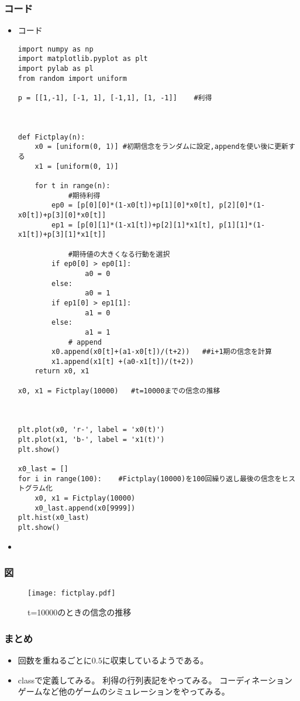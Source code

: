 \documentclass[dvipdfmx,fleqn]{beamer}
\begin{document}
\begin{frame}[fragile]%
\frametitle{コード}
\begin{itemize}\setlength{\parskip}{0.5em}
\item
コード
\begin{verbatim}
import numpy as np
import matplotlib.pyplot as plt
import pylab as pl
from random import uniform

p = [[1,-1], [-1, 1], [-1,1], [1, -1]]    #利得


        
def Fictplay(n):
    x0 = [uniform(0, 1)] #初期信念をランダムに設定,appendを使い後に更新する
    x1 = [uniform(0, 1)]
    
    for t in range(n):
            #期待利得 
        ep0 = [p[0][0]*(1-x0[t])+p[1][0]*x0[t], p[2][0]*(1-x0[t])+p[3][0]*x0[t]]
        ep1 = [p[0][1]*(1-x1[t])+p[2][1]*x1[t], p[1][1]*(1-x1[t])+p[3][1]*x1[t]]
            
            #期待値の大きくなる行動を選択
        if ep0[0] > ep0[1]:
                a0 = 0
        else:
                a0 = 1
        if ep1[0] > ep1[1]:
                a1 = 0
        else:
                a1 = 1
            # append
        x0.append(x0[t]+(a1-x0[t])/(t+2))   ##i+1期の信念を計算
        x1.append(x1[t] +(a0-x1[t])/(t+2))
    return x0, x1

x0, x1 = Fictplay(10000)   #t=10000までの信念の推移

            

plt.plot(x0, 'r-', label = 'x0(t)')
plt.plot(x1, 'b-', label = 'x1(t)')
plt.show()

x0_last = []
for i in range(100):    #Fictplay(10000)を100回繰り返し最後の信念をヒストグラム化
    x0, x1 = Fictplay(10000)
    x0_last.append(x0[9999])
plt.hist(x0_last)
plt.show()
\end{verbatim}

\item

\end{itemize}
\end{frame}



\begin{frame}
\frametitle{図}
\begin{figure}
 \centering
 \texttt{[image: fictplay.pdf]}
 \caption{t=10000のときの信念の推移}
 \label{fig:matchingpennies_plot}
\end{figure}
\end{frame}



\begin{frame}
\frametitle{まとめ}
\begin{itemize}\setlength{\parskip}{0.5em}
\item
回数を重ねるごとに$0.5$に収束しているようである。



\item
classで定義してみる。
利得の行列表記をやってみる。
コーディネーションゲームなど他のゲームのシミュレーションをやってみる。
\end{itemize}
\end{frame}
\end{document}
